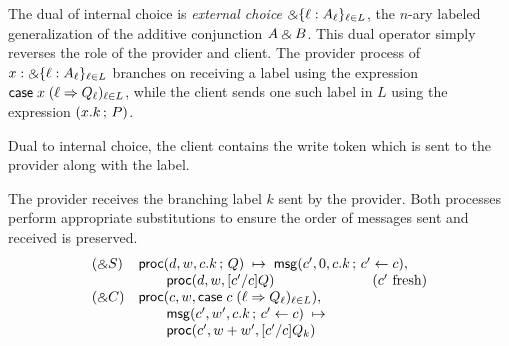 The dual of internal choice is \emph{external choice} $\mathbin{\binampersand} \{ \ell :
A_\ell \}_{\ell \in L}$, the $n$-ary labeled generalization of the
additive conjunction $A \mathbin{\binampersand} B$. This dual operator simply reverses
the role of the provider and client. The provider process of
$x : \mathbin{\binampersand} \{ \ell : A_\ell \}_{\ell \in L}$ branches on receiving a label
using the expression $\mathsf{case} \; x \; (\ell \Rightarrow Q_\ell)_{\ell \in L}$,
while the client sends one such label in $L$ using the expression $(x.k \, ; \, P)$.

Dual to internal choice, the client contains the write token which is
sent to the provider along with the label.

The provider receives the branching label $k$ sent by the provider. Both
processes perform appropriate substitutions to ensure the order of messages
sent and received is preserved.
\[
\begin{array}{lll}
(\mathbin{\binampersand} S) & \mathsf{proc}(d, w, c.k \, ; \, Q) \; \mapsto \; \mathsf{msg}(c', 0, c.k \, ; \, c' \leftarrow c), \\
& \qquad \mathsf{proc}(d, w, [c'/c]Q) \quad \qquad \qquad \qquad (c' \text{ fresh}) \\
(\mathbin{\binampersand} C) & \mathsf{proc}(c, w, \mathsf{case} \; c \; (\ell \Rightarrow Q_\ell)_{\ell \in L}), \\
& \qquad \mathsf{msg}(c', w', c.k \, ; \, c' \leftarrow c) \; \mapsto \; \\
& \qquad \mathsf{proc}(c', w+w', [c'/c]Q_k)
\end{array}
\]

